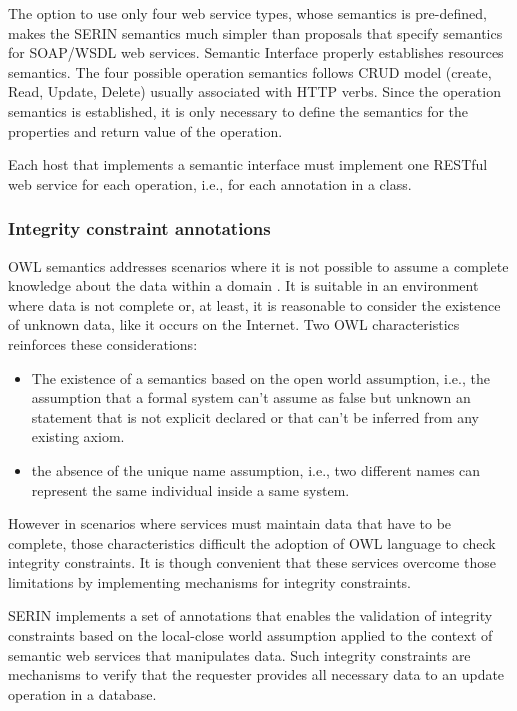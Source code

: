 \documentclass{singlecol-new}
\theoremstyle{TH}{
\newtheorem{lemma}{Lemma}
\newtheorem{theorem}[lemma]{Theorem}
\newtheorem{corrolary}[lemma]{Corrolary}
\newtheorem{conjecture}[lemma]{Conjecture}
\newtheorem{proposition}[lemma]{Proposition}
\newtheorem{claim}[lemma]{Claim}
\newtheorem{stheorem}[lemma]{Wrong Theorem}
\newtheorem{algorithm}{Algorithm}
}
\theoremstyle{THrm}{
\newtheorem{definition}{Definition}[section]
\newtheorem{question}{Question}[section]
\newtheorem{remark}{Remark}
\newtheorem{scheme}{Scheme}
}
\theoremstyle{THhit}{
\newtheorem{case}{Case}[section]
}
\begin{document}
The option to use only four web service types, whose semantics is pre-defined, makes the SERIN semantics much simpler than proposals that specify semantics for SOAP/WSDL web services. 
Semantic Interface properly establishes resources semantics. 
The four possible operation semantics follows CRUD model (create, Read, Update, Delete) usually associated with HTTP verbs.
Since the operation semantics is established, it is only necessary to define the semantics for the properties and return value of the operation.

Each host that implements a semantic interface must implement one RESTful web service for each operation, i.e., for each annotation in a class. 

\subsubsection{Integrity constraint annotations}
\label{sec:constraintsannot}
OWL semantics addresses scenarios where it is not possible to assume a complete knowledge about the data within a domain \citep{tao2010integrity}. 
It is suitable in an environment where data is not complete or, at least, it is reasonable to consider the existence of unknown data, like it occurs on the Internet. 
Two OWL characteristics reinforces these considerations:
\begin{itemize}
	\item The existence of a semantics based on the open world assumption, i.e., the assumption that a formal system can't assume as false but unknown an statement that is not explicit declared or that can't be inferred from any existing axiom.
	\item the absence of the unique name assumption, i.e., two different names can represent the same individual inside a same system. 
\end{itemize}

However in scenarios where services must maintain data that have to be complete, those characteristics difficult the adoption of OWL language to check integrity constraints.
It is though convenient that these services overcome those limitations by implementing mechanisms for integrity constraints.

SERIN implements a set of annotations that enables the validation of integrity constraints based on the local-close world assumption applied to the context of semantic web services that manipulates data.
Such integrity constraints are mechanisms to verify that the requester provides all necessary data to an update operation in a database.  
\end{document}
